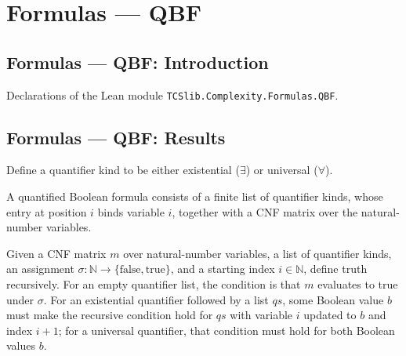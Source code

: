 \section{Formulas --- QBF}
\subsection*{Formulas --- QBF: Introduction}

Declarations of the Lean module \texttt{TCSlib.Complexity.Formulas.QBF}.

\subsection*{Formulas --- QBF: Results}

\begin{definition}
\label{Complexity.QBF.Quant}
\leanok
Define a quantifier kind to be either existential ($\exists$) or universal ($\forall$).
\end{definition}

\begin{definition}
\label{Complexity.QBF}
\leanok
{}
A quantified Boolean formula consists of a finite list of quantifier kinds, whose entry
at position $i$ binds variable $i$, together with a CNF matrix over the natural-number
variables.
\end{definition}

\begin{definition}
\label{Complexity.QBF.truthAux}
\leanok
{}
Given a CNF matrix $m$ over natural-number variables, a list of quantifier kinds, an
assignment $\sigma:\mathbb N\to\{\mathrm{false},\mathrm{true}\}$, and a starting index
$i\in\mathbb N$, define truth recursively. For an empty quantifier list, the condition
is that $m$ evaluates to true under $\sigma$. For an existential quantifier followed by
a list $qs$, some Boolean value $b$ must make the recursive condition hold for $qs$ with
variable $i$ updated to $b$ and index $i+1$; for a universal quantifier, that condition
must hold for both Boolean values $b$.
\end{definition}

